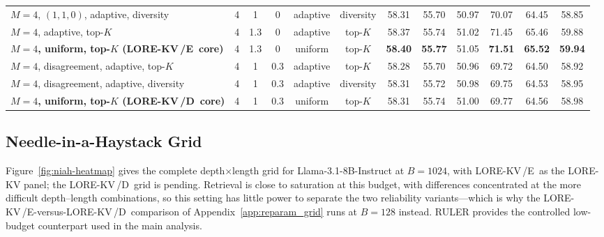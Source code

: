 \documentclass{article} %
\newcommand{\lorekvE}{LORE-KV\,/E}
\newcommand{\lorekvD}{LORE-KV\,/D}
\begin{document}
\begin{table}[t]
{\begin{tabular}{@{}lccccccccccc@{}}
$M{=}4$, $(1,1,0)$, adaptive, diversity
& 4 & 1 & 0 & adaptive & diversity
& 58.31 & 55.70 & 50.97
& 70.07 & 64.45 & 58.85 \\

$M{=}4$, adaptive, top-$K$
& 4 & 1.3 & 0 & adaptive & top-$K$
& 58.37 & 55.74 & 51.02
& 71.45 & 65.46 & 59.88 \\

\textbf{$M{=}4$, uniform, top-$K$ (\lorekvE\ core)}
& 4 & 1.3 & 0 & uniform & top-$K$
& \textbf{58.40} & \textbf{55.77} & 51.05
& \textbf{71.51} & \textbf{65.52} & \textbf{59.94} \\

\midrule

$M{=}4$, disagreement, adaptive, top-$K$
& 4 & 1 & 0.3 & adaptive & top-$K$
& 58.28 & 55.70 & 50.96
& 69.72 & 64.50 & 58.92 \\

$M{=}4$, disagreement, adaptive, diversity
& 4 & 1 & 0.3 & adaptive & diversity
& 58.31 & 55.72 & 50.98
& 69.75 & 64.53 & 58.95 \\

\textbf{$M{=}4$, uniform, top-$K$ (\lorekvD\ core)}
& 4 & 1 & 0.3 & uniform & top-$K$
& 58.31 & 55.74 & 51.00
& 69.77 & 64.56 & 58.98 \\

\bottomrule
\end{tabular}%
}
\end{table}



\subsection{Needle-in-a-Haystack Grid}
\label{app:niah_extra}
\label{app:large_models}

Figure~\ref{fig:niah-heatmap} gives the complete depth$\times$length grid for Llama-3.1-8B-Instruct at $B{=}1024$, with \lorekvE\ as the LORE-KV panel; the \lorekvD\ grid is pending. Retrieval is close to saturation at this budget, with differences concentrated at the more difficult depth--length combinations, so this setting has little power to separate the two reliability variants---which is why the \lorekvE-versus-\lorekvD\ comparison of Appendix~\ref{app:reparam_grid} runs at $B{=}128$ instead. RULER provides the controlled low-budget counterpart used in the main analysis.
\end{document}
